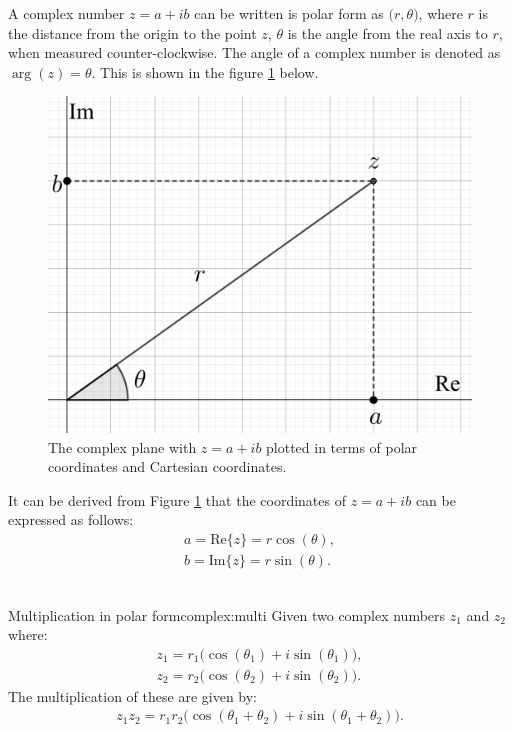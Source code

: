 \noindent A complex number $z=a+ib$ can be written is polar form as $\big(r,\theta\big)$, where $r$ is the distance from the origin to the point $z$, $\theta$ is the angle from the real axis to $r$, when measured counter-clockwise. The angle of a complex number is denoted as $\arg(z)=\theta$. This is shown in the figure \ref{fig:complex_plane_polar} below.
\begin{figure}[H] 
\centering
\includegraphics[scale=0.15]{fig/img/complex_plan_polar}
\caption{The complex plane with $z=a+ib$ plotted in terms of polar coordinates and Cartesian coordinates.}
\label{fig:complex_plane_polar}
\end{figure}
\noindent
It can be derived from Figure \ref{fig:complex_plane_polar} that the coordinates of $z=a+ib$ can be expressed as follows:
\begin{align}
a=\text{Re}\{z\}=r\cos(\theta),
\\
b=\text{Im}\{z\}=r\sin(\theta).
\end{align}
\\

\begin{theorem}{Multiplication in polar form}{complex:multi}
Given two complex numbers $z_1$ and $z_2$ where:
\begin{align*}
z_1=r_1\big( \cos(\theta_1)+i\sin(\theta_1) \big), 
\\
z_2=r_2\big( \cos(\theta_2)+i\sin(\theta_2) \big).
\end{align*}
The multiplication of these are given by:
\begin{align}
z_1 z_2=r_1r_2\big( \cos(\theta_1+\theta_2)+ i \sin(\theta_1+\theta_2)\big). \label{pol:trig}
\end{align}
\end{theorem}


